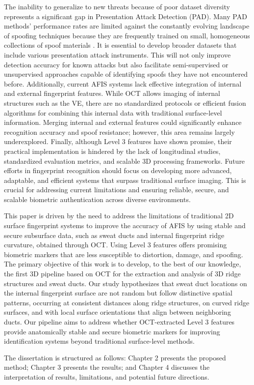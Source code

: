 The inability to generalize to new threats because of poor dataset diversity represents a significant gap in Presentation Attack Detection (PAD). Many PAD methods' performance rates are limited against the constantly evolving landscape of spoofing techniques because they are frequently trained on small, homogeneous collections of spoof materials \parencite{liuFingerprintPresentationAttack2022,sunNewApproachAutomated2023,liuOneClassFingerprintPresentation2021}. It is essential to develop broader datasets that include various presentation attack instruments. This will not only improve detection accuracy for known attacks but also facilitate semi-supervised or unsupervised approaches capable of identifying spoofs they have not encountered before. Additionally, current AFIS systems lack effective integration of internal and external fingerprint features. While OCT allows imaging of internal structures such as the VE, there are no standardized protocols or efficient fusion algorithms for combining this internal data with traditional surface-level information. Merging internal and external features could significantly enhance recognition accuracy and spoof resistance; however, this area remains largely underexplored. Finally, although Level 3 features have shown promise, their practical implementation is hindered by the lack of longitudinal studies, standardized evaluation metrics, and scalable 3D processing frameworks. Future efforts in fingerprint recognition should focus on developing more advanced, adaptable, and efficient systems that surpass traditional surface imaging. This is crucial for addressing current limitations and ensuring reliable, secure, and scalable biometric authentication across diverse environments.

This paper is driven by the need to address the limitations of traditional 2D surface fingerprint systems to improve the accuracy of AFIS by using stable and secure subsurface data, such as sweat ducts and internal fingerprint ridge curvature, obtained through OCT. Using Level 3 features offers promising biometric markers that are less susceptible to distortion, damage, and spoofing. The primary objective of this work is to develop, to the best of our knowledge, the first 3D pipeline based on OCT for the extraction and analysis of 3D ridge structures and sweat ducts. Our study hypothesizes that sweat duct locations on the internal fingerprint surface are not random but follow distinctive spatial patterns, occurring at consistent distances along ridge structures, on curved ridge surfaces, and with local surface orientations that align between neighboring ducts. Our pipeline aims to address whether OCT-extracted Level 3 features provide anatomically stable and secure biometric markers for improving identification systems beyond traditional surface-level methods. 

The dissertation is structured as follows: Chapter 2 presents the proposed method; Chapter 3 presents the results; and Chapter 4 discusses the interpretation of results, limitations, and potential future directions.
